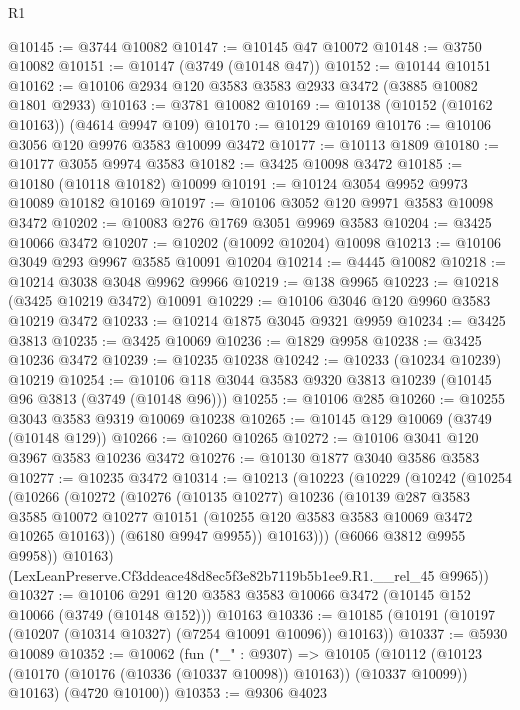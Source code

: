 \begin{lexlean}{R1}
\begin{coremodule}
@10145 := @3744 @10082
@10147 := @10145 @47 @10072
@10148 := @3750 @10082
@10151 := @10147 (@3749 (@10148 @47))
@10152 := @10144 @10151
@10162 := @10106 @2934 @120 @3583 @3583 @2933 @3472 (@3885 @10082 @1801 @2933)
@10163 := @3781 @10082
@10169 := @10138 (@10152 (@10162 @10163)) (@4614 @9947 @109)
@10170 := @10129 @10169
@10176 := @10106 @3056 @120 @9976 @3583 @10099 @3472
@10177 := @10113 @1809
@10180 := @10177 @3055 @9974 @3583
@10182 := @3425 @10098 @3472
@10185 := @10180 (@10118 @10182) @10099
@10191 := @10124 @3054 @9952 @9973 @10089 @10182 @10169
@10197 := @10106 @3052 @120 @9971 @3583 @10098 @3472
@10202 := @10083 @276 @1769 @3051 @9969 @3583
@10204 := @3425 @10066 @3472
@10207 := @10202 (@10092 @10204) @10098
@10213 := @10106 @3049 @293 @9967 @3585 @10091 @10204
@10214 := @4445 @10082
@10218 := @10214 @3038 @3048 @9962 @9966
@10219 := @138 @9965
@10223 := @10218 (@3425 @10219 @3472) @10091
@10229 := @10106 @3046 @120 @9960 @3583 @10219 @3472
@10233 := @10214 @1875 @3045 @9321 @9959
@10234 := @3425 @3813
@10235 := @3425 @10069
@10236 := @1829 @9958
@10238 := @3425 @10236 @3472
@10239 := @10235 @10238
@10242 := @10233 (@10234 @10239) @10219
@10254 := @10106 @118 @3044 @3583 @9320 @3813 @10239 (@10145 @96 @3813 (@3749 (@10148 @96)))
@10255 := @10106 @285
@10260 := @10255 @3043 @3583 @9319 @10069 @10238
@10265 := @10145 @129 @10069 (@3749 (@10148 @129))
@10266 := @10260 @10265
@10272 := @10106 @3041 @120 @3967 @3583 @10236 @3472
@10276 := @10130 @1877 @3040 @3586 @3583
@10277 := @10235 @3472
@10314 := @10213
    (@10223
      (@10229
        (@10242
          (@10254
            (@10266
              (@10272
                (@10276
                  (@10135 @10277)
                  @10236
                  (@10139
                    @287
                    @3583
                    @3585
                    @10072
                    @10277
                    @10151
                    (@10255 @120 @3583 @3583 @10069 @3472 @10265 @10163))
                  (@6180 @9947 @9955))
                @10163)))
          (@6066 @3812 @9955 @9958))
        @10163)
      (LexLeanPreserve.Cf3ddeace48d8ec5f3e82b7119b5b1ee9.R1.__rel_45 @9965))
@10327 := @10106
    @291
    @120
    @3583
    @3583
    @10066
    @3472
    (@10145 @152 @10066 (@3749 (@10148 @152)))
    @10163
@10336 := @10185 (@10191 (@10197 (@10207 (@10314 @10327) (@7254 @10091 @10096)) @10163))
@10337 := @5930 @10089
@10352 := @10062
    (fun ("_" : @9307) =>
    @10105
      (@10112 (@10123 (@10170 (@10176 (@10336 (@10337 @10098)) @10163)) (@10337 @10099)) @10163)
      (@4720 @10100))
@10353 := @9306 @4023

\end{coremodule}
\end{lexlean}
